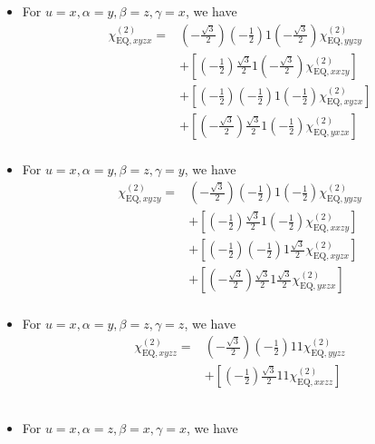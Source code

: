 \documentclass[UTF8,10pt,a4paper]{article}
\begin{document}
\begin{itemize}
\item For $u=x,\alpha=y,\beta=z,\gamma=x$, we have
\footnotesize\begin{align}
\nonumber\chi_{\text{EQ},xyzx}^{(2)}=&\left(-\frac{\sqrt{3}}{2}\right)\left(-\frac{1}{2}\right)1\left(-\frac{\sqrt{3}}{2}\right)\chi_{\text{EQ},yyzy}^{(2)}\\
\nonumber&+\left[\left(-\frac{1}{2}\right)\frac{\sqrt{3}}{2}1\left(-\frac{\sqrt{3}}{2}\right)\chi_{\text{EQ},xxzy}^{(2)}\right]\\
\nonumber&+\left[\left(-\frac{1}{2}\right)\left(-\frac{1}{2}\right)1\left(-\frac{1}{2}\right)\chi_{\text{EQ},xyzx}^{(2)}\right]\\
\nonumber&+\left[\left(-\frac{\sqrt{3}}{2}\right)\frac{\sqrt{3}}{2}1\left(-\frac{1}{2}\right)\chi_{\text{EQ},yxzx}^{(2)}\right]\\
&
\end{align}\normalsize
\item For $u=x,\alpha=y,\beta=z,\gamma=y$, we have
\footnotesize\begin{align}
\nonumber\chi_{\text{EQ},xyzy}^{(2)}=&\left(-\frac{\sqrt{3}}{2}\right)\left(-\frac{1}{2}\right)1\left(-\frac{1}{2}\right)\chi_{\text{EQ},yyzy}^{(2)}\\
\nonumber&+\left[\left(-\frac{1}{2}\right)\frac{\sqrt{3}}{2}1\left(-\frac{1}{2}\right)\chi_{\text{EQ},xxzy}^{(2)}\right]\\
\nonumber&+\left[\left(-\frac{1}{2}\right)\left(-\frac{1}{2}\right)1\frac{\sqrt{3}}{2}\chi_{\text{EQ},xyzx}^{(2)}\right]\\
\nonumber&+\left[\left(-\frac{\sqrt{3}}{2}\right)\frac{\sqrt{3}}{2}1\frac{\sqrt{3}}{2}\chi_{\text{EQ},yxzx}^{(2)}\right]\\
&
\end{align}\normalsize
\item For $u=x,\alpha=y,\beta=z,\gamma=z$, we have
\footnotesize\begin{align}
\nonumber\chi_{\text{EQ},xyzz}^{(2)}=&\left(-\frac{\sqrt{3}}{2}\right)\left(-\frac{1}{2}\right)11\chi_{\text{EQ},yyzz}^{(2)}\\
\nonumber&+\left[\left(-\frac{1}{2}\right)\frac{\sqrt{3}}{2}11\chi_{\text{EQ},xxzz}^{(2)}\right]\\
\nonumber&\\
\nonumber&\\
&
\end{align}\normalsize
\item For $u=x,\alpha=z,\beta=x,\gamma=x$, we have
\footnotesize\begin{align}

\end{align}
\end{itemize}
\end{document}
